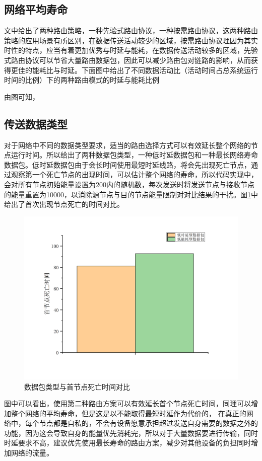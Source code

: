 \documentclass[a4paper,AutoFakeBold,oneside,12pt]{book}
\begin{document}
  \subsection{网络平均寿命}
  文中给出了两种路由策略，一种先验式路由协议，一种按需路由协议，这两种路由策略的应用场景有所区别，在数据传送活动较少的区域，按需路由协议理因为其实时性的特点，应当有着更加优秀与时延与能耗，在数据传送活动较多的区域，先验式路由协议可以节省大量路由数据包，因此可以减少路由包对链路的影响，从而获得更佳的能耗比与时延。下面图中给出了不同数据活动比（活动时间占总系统运行时间的比例）下的两种路由模式的时延与能耗比例
  
  由图可知， 
  \subsection{传送数据类型}
  对于网络中不同的数据类型要求，适当的路由选择方式可以有效延长整个网络的节点运行时间。所以给出了两种数据包类型，一种低时延数据包和一种最长网络寿命数据包。低时延数据包由于会长时间使用最短时延线路，将会先出现死亡节点，通过观察第一个死亡节点的出现时间，可以估计整个网络的寿命，所以代码实现中，会对所有节点初始能量设置为200内的随机数，每次发送时将发送节点与接收节点的能量重置为10000，以消除源节点与目的节点能量限制对对比结果的干扰。图\ref{datatype-die}中给出了首次出现节点死亡的时间对比。
 
  \begin{figure}[htbp]
\centering %
\includegraphics[scale=0.3]{pictures/datatype-die.png} 
\caption{数据包类型与首节点死亡时间对比 } %
\label{datatype-die}
\end{figure}
  图中可以看出，使用第二种路由方案可以有效延长首个节点死亡时间，同理可以增加整个网络的平均寿命，但是这是以不能取得最短时延作为代价的，
  在真正的网络中，每个节点都是自私的，不会有设备愿意承担超过发送自身需要的数据之外的功能，因为这会导致自身的能量优先消耗完，所以对于大量数据要进行传输，同时时延要求不高，建议优先使用最长寿命的路由方案，减少对其他设备的负担同时增加网络的流量。
\end{document}
